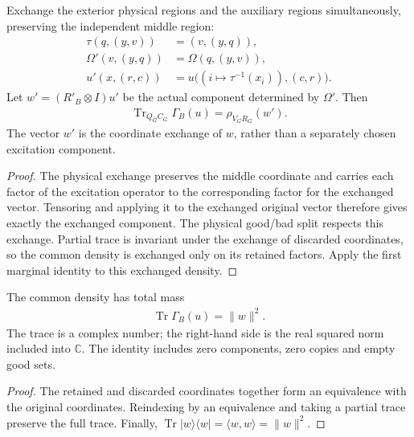 \begin{theorem}
\label{thm:replica_good_pair_marginal_left}
\leanok
{}
Exchange the exterior physical regions and the auxiliary regions simultaneously,
preserving the independent middle region:
\begin{align}
 \tau(q,(y,v))&=(v,(y,q)),\\
 \Omega'(v,(y,q))&=\Omega(q,(y,v)),\\
 u'(x,(r,c))&=u\bigl((i\mapsto\tau^{-1}(x_i)),(c,r)\bigr).
\end{align}
Let $w'=(R'_B\otimes I)u'$ be the actual component determined by $\Omega'$.
Then
\begin{align}
 \operatorname{Tr}_{Q_G C_G}\Gamma_B(u)=\rho_{V_G R_G}(w').
\end{align}
The vector $w'$ is the coordinate exchange of $w$, rather than a separately
chosen excitation component.
\end{theorem}
\begin{proof}
\leanok
The physical exchange preserves the middle coordinate and carries each factor of the excitation
operator to the corresponding factor for the exchanged vector. Tensoring
and applying it to the exchanged original vector therefore gives exactly
the exchanged component. The physical good/bad split respects this exchange.
Partial trace is invariant under the exchange of discarded coordinates,
so the common density is exchanged only on its retained factors. Apply
the first marginal identity to this exchanged density.
\end{proof}

\begin{theorem}
\label{thm:replica_good_pair_marginal_trace}
\leanok
{}
The common density has total mass
\begin{align}
 \operatorname{Tr}\Gamma_B(u)=\|w\|^2.
\end{align}
The trace is a complex number; the right-hand side is the real squared norm
included into $\mathbb C$. The identity includes zero components, zero copies
and empty good sets.
\end{theorem}
\begin{proof}
\leanok
The retained and discarded coordinates together form an equivalence with
the original coordinates. Reindexing by an equivalence and taking a partial
trace preserve the full trace. Finally,
$\operatorname{Tr}|w\rangle\langle w|=\langle w,w\rangle=\|w\|^2$.
\end{proof}
